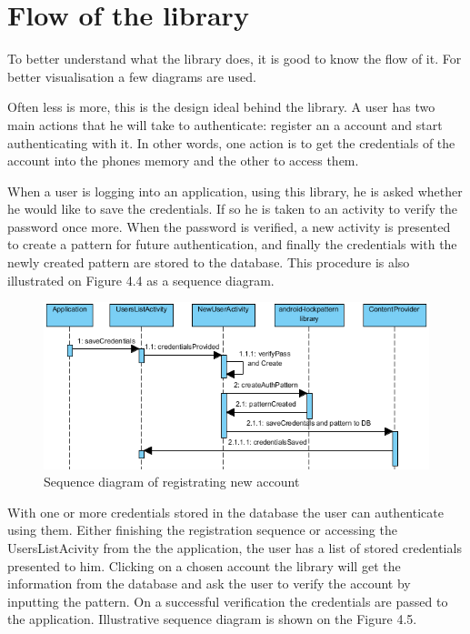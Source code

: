 \newpage

\section{Flow of the library}
To better understand what the library does, it is good to know the flow of it. For better visualisation a few diagrams are used.

Often less is more, this is the design ideal behind the library. A user has two main actions that he will take to authenticate: register an a account and start authenticating with it. In other words, one action is to get the credentials of the account into the phones memory and the other to access them.
 
When a user is logging into an application, using this library, he is asked whether he would like to save the credentials. If so he is taken to an activity to verify the password once more. When the password is verified, a new activity is presented to create a pattern for future authentication, and finally the credentials with the newly created pattern are stored to the database. This procedure is also illustrated on Figure 4.4 as a sequence diagram.

\begin{figure}[h]
\begin{center}
\includegraphics[scale=0.9]{images/sequencediagramnew.png}
\caption{Sequence diagram of registrating new account} \label{fig:sequence diagram} 
\end{center}
\end{figure}

With one or more credentials stored in the database the user can authenticate using them. Either finishing the registration sequence or accessing the UsersListAcivity from the the application, the user has a list of stored credentials presented to him. Clicking on a chosen account the library will get the information from the database and ask the user to verify the account by inputting the pattern. On a successful verification the credentials are passed to the application. Illustrative sequence diagram is shown on the Figure 4.5.

